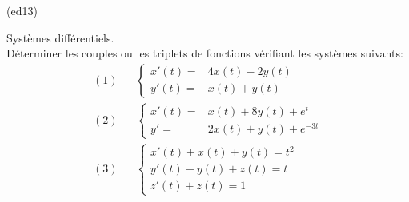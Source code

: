 \begin{tiny}(ed13)\end{tiny} Systèmes différentiels.\\
Déterminer les couples ou les triplets de fonctions vérifiant les systèmes suivants:
\begin{align*}
 (1)& &\left\lbrace
\begin{aligned}
 x'(t) =& 4x(t)-2y(t)\\
 y'(t) =& x(t) + y(t)
\end{aligned}
\right. \\
 (2)& &\left\lbrace
\begin{aligned}
 x'(t) =& x(t) + 8y(t) +e^t \\
 y' =& 2x(t) + y(t) + e^{-3t}
\end{aligned}
\right. \\
 (3)& &\left\lbrace
\begin{aligned}
 x'(t) + x(t) + y(t) = t^2 \\
 y'(t) + y(t) + z(t) = t \\
 z'(t) + z(t) = 1
\end{aligned}
\right.
\end{align*}

